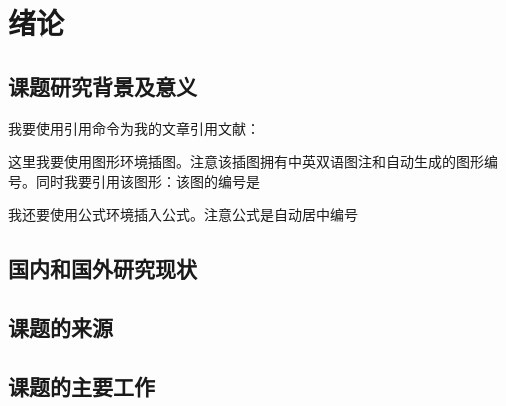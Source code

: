 \chapter{绪论}
\label{intro}



\section{课题研究背景及意义}
我要使用引用命令为我的文章引用文献：


这里我要使用图形环境插图。注意该插图拥有中英双语图注和自动生成的图形编号。同时我要引用该图形：该图的编号是


我还要使用公式环境插入公式。注意公式是自动居中编号

\section{国内和国外研究现状}
\section{课题的来源}
\section{课题的主要工作}

